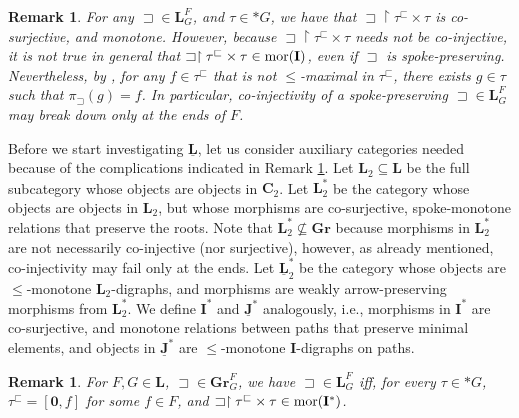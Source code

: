\documentclass[12pt]{amsart}
\numberwithin{equation}{section}
\theoremstyle{plain}
\newtheorem{lemma}[theorem]{Lemma}
\newtheorem{remark}[theorem]{\bf Remark}
\theoremstyle{definition}
\newcommand \sqsp{\sqsupset}
\newcommand \sqsb{\sqsubset}
\newcommand \mor{{\rm{mor}}}
\newcommand \rt{\mathbf{0}}
\newcommand \uhr{\upharpoonright}
\newcommand \CCb{\mathbf{C}}
\newcommand \GGRb{\mathbf{Gr}}
\newcommand \IIb{\mathbf{I}}
\newcommand \LLb{\mathbf{L}}
\newcommand \JJub{\underline{\mathbf{J}}}
\newcommand \LLub{\underline{\mathbf{L}}}
\begin{document}
 \begin{remark}
\label{re:Break}
 For any $\sqsp \in \LLb^F_G$, and $\tau \in *G$, we have that $\sqsp \uhr \tau^\sqsb \times \tau$ is co-surjective, and monotone. However, because $\sqsp \uhr \tau^\sqsb \times \tau$ needs not be co-injective, it is not true in general that $\sqsp \uhr \tau^\sqsb \times \tau \in \mor(\IIb)$, even if $\sqsp$ is spoke-preserving. Nevertheless, by \cite[Lemma 5.18]{BaBiVi2}, for any $f \in \tau^\sqsb$ that is not $\leq$-maximal in $\tau^\sqsb$, there exists $g \in \tau$ such that $\pi_\sqsp(g)=f$. In particular, co-injectivity of a spoke-preserving $\sqsp \in \LLb^F_G$ may break down only at the ends of $F$. %
 \end{remark}
 
Before we start investigating $\LLub$, let us consider auxiliary categories needed because of the complications indicated in Remark \ref{re:Break}. Let $\LLb_2 \subseteq \LLb$ be the full subcategory whose objects are objects in $\CCb_2$. Let $\LLb_2^*$ be the category whose objects are objects in $\LLb_2$, but whose morphisms are co-surjective, spoke-monotone relations that preserve the roots. Note that $\LLb_2^* \not \subseteq \GGRb$ because morphisms in $\LLb_2^*$ are not necessarily co-injective (nor surjective), however, as already mentioned, co-injectivity may fail only at the ends. Let $\LLub^*_2$ be the category whose objects are $\leq$-monotone $\LLb_2$-digraphs, and morphisms are weakly arrow-preserving morphisms from  $\LLb_2^*$. We define $\IIb^*$ and $\JJub^*$ analogously, i.e., morphisms in $\IIb^*$ are co-surjective, and monotone relations between paths that preserve minimal elements, and objects in $\JJub^*$ are $\leq$-monotone $\IIb$-digraphs on paths. 

\begin{remark}
For $F, G \in \LLb$, $\sqsp \in \GGRb^F_G$, we have $\sqsp \in \LLb^F_G$ iff, for every $\tau \in *G$,  $\tau^\sqsb=[\rt,f]$ for some $f \in F$, and $\sqsp \uhr \tau^\sqsb \times \tau \in \mor(\IIb^*)$.
\end{remark}

\end{document}
